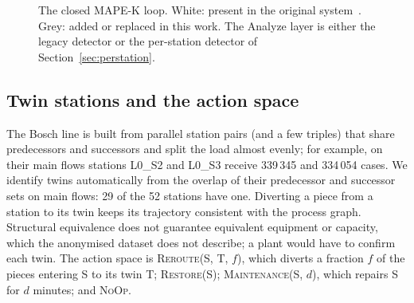 \documentclass[preprint,11pt]{elsarticle}
\begin{document}
\begin{figure}[t]
\centering
{}
\caption{The closed MAPE-K loop. White: present in the original system~\cite{sanchez2020selfstar}. Grey: added or replaced in this work. The Analyze layer is either the legacy detector or the per-station detector of Section~\ref{sec:perstation}.}
\label{fig:loop}
\end{figure}

\subsection{Twin stations and the action space}
The Bosch line is built from parallel station pairs (and a few triples) that share predecessors and successors and split the load almost evenly; for example, on their main flows stations L0\_S2 and L0\_S3 receive 339\,345 and 334\,054 cases. We identify twins automatically from the overlap of their predecessor and successor sets on main flows: 29 of the 52 stations have one. Diverting a piece from a station to its twin keeps its trajectory consistent with the process graph. Structural equivalence does not guarantee equivalent equipment or capacity, which the anonymised dataset does not describe; a plant would have to confirm each twin. The action space is \textsc{Reroute}(S, T, $f$), which diverts a fraction $f$ of the pieces entering S to its twin T; \textsc{Restore}(S); \textsc{Maintenance}(S, $d$), which repairs S for $d$ minutes; and \textsc{NoOp}.
\end{document}

